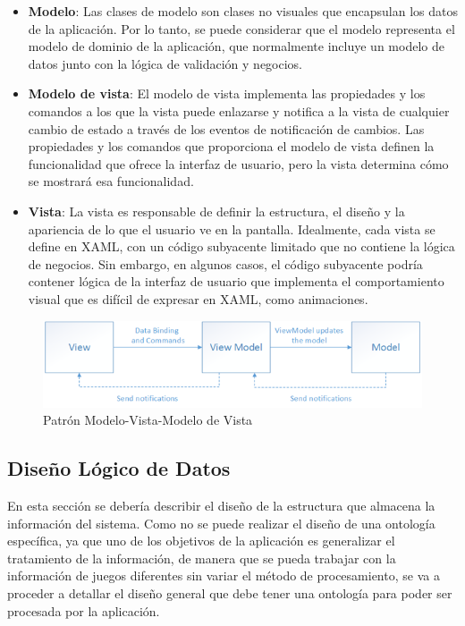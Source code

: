 \begin{itemize}

    \item \textbf{Modelo}: Las clases de modelo son clases no 
    visuales que encapsulan los datos de la aplicación. Por lo tanto, se 
    puede considerar que el modelo representa el modelo de dominio de la 
    aplicación, que normalmente incluye un modelo de datos junto con la 
    lógica de validación y negocios. 

    \item \textbf{Modelo de vista}: El modelo de vista implementa las 
    propiedades y los comandos a los que la vista puede enlazarse y notifica 
    a la vista de cualquier cambio de estado a través de los eventos de 
    notificación de cambios. Las propiedades y los comandos que proporciona 
    el modelo de vista definen la funcionalidad que ofrece la interfaz de 
    usuario, pero la vista determina cómo se mostrará esa funcionalidad.

    \item \textbf{Vista}: La vista es responsable de definir 
    la estructura, el diseño y la apariencia de lo que el usuario ve 
    en la pantalla. Idealmente, cada vista se define en XAML, con un 
    código subyacente limitado que no contiene la lógica de negocios. 
    Sin embargo, en algunos casos, el código subyacente podría contener 
    lógica de la interfaz de usuario que implementa el comportamiento 
    visual que es difícil de expresar en XAML, como animaciones.

\end{itemize}
\bigskip
\begin{figure}[htp]
    \centering
    \includegraphics[width=13cm]{Figures/mvvm.png}
    \caption{Patrón Modelo-Vista-Modelo de Vista}
\end{figure}

\subsection{Diseño Lógico de Datos}
En esta sección se debería describir el diseño de la estructura que almacena la información del sistema.
Como no se puede realizar el diseño de una ontología específica, ya que uno de los objetivos de la aplicación 
es generalizar el tratamiento de la información, de manera que se pueda trabajar con la información de juegos 
diferentes sin variar el método de procesamiento, se va a proceder a detallar el diseño general que debe 
tener una ontología para poder ser procesada por la aplicación. \medskip

